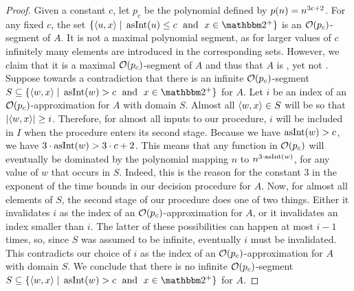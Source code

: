 \begin{proof}
  Given a constant $c$, let $p_c$ be the polynomial defined by $p(n) = n^{3c + 2}$.
  For any fixed $c$, the set $\{\pair{u}{x} \st \asNat(u) \le c \reland x \in \binary^+\}$ is an $\operatorname{\mathcal{O}}(p_c)$-segment of $A$.
  It is not a maximal polynomial segment, as for larger values of $c$ infinitely many elements are introduced in the corresponding sets.
  However, we claim that it is a maximal $\operatorname{\mathcal{O}}(p_c)$-segment of $A$ and thus that $A$ is , yet not .
  Suppose towards a contradiction that there is an infinite $\operatorname{\mathcal{O}}(p_c)$-segment $S \subseteq \{\pair{w}{x} \st \asNat(w) > c \reland x \in \binary^+\}$ for $A$.
  Let $i$ be an index of an $\operatorname{\mathcal{O}}(p_c)$-approximation for $A$ with domain $S$.
  Almost all ${\langle w, x\rangle} \in S$ will be so that ${\lvert{\langle w, x\rangle}\rvert} \ge i$.
  Therefore, for almost all inputs to our procedure, $i$ will be included in $I$ when the procedure enters its second stage.
  Because we have $\operatorname{asInt}(w) > c$, we have $3 \cdot \operatorname{asInt}(w) > 3 \cdot c + 2$.
  This means that any function in $\operatorname{\mathcal{O}}(p_c)$ will eventually be dominated by the polynomial mapping $n$ to $n^{3 \cdot \operatorname{asInt}(w)}$, for any value of $w$ that occurs in $S$.
  Indeed, this is the reason for the constant $3$ in the exponent of the time bounds in our decision procedure for $A$.
  Now, for almost all elements of $S$, the second stage of our procedure does one of two things.
  Either it invalidates $i$ as the index of an $\operatorname{\mathcal{O}}(p_c)$-approximation for $A$, or it invalidates an index smaller than $i$.
  The latter of these possibilities can happen at most $i - 1$ times, so, since $S$ was assumed to be infinite, eventually $i$ must be invalidated.
  This contradicts our choice of $i$ as the index of an $\operatorname{\mathcal{O}}(p_c)$-approximation for $A$ with domain $S$.
  We conclude that there is no infinite $\operatorname{\mathcal{O}}(p_c)$-segment $S \subseteq \{\pair{w}{x} \st \asNat(w) > c \reland x \in \binary^+\}$ for $A$.
\end{proof}

